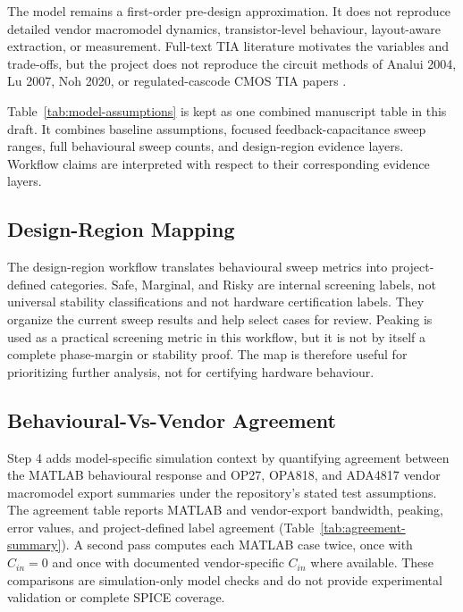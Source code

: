 The model remains a first-order pre-design approximation. It does not reproduce detailed vendor macromodel dynamics, transistor-level behaviour, layout-aware extraction, or measurement. Full-text TIA literature motivates the variables and trade-offs, but the project does not reproduce the circuit methods of Analui 2004, Lu 2007, Noh 2020, or regulated-cascode CMOS TIA papers \citep{ANALUI_2004_BW_ENHANCEMENT,LU_2007_BROADBAND_TIA,NOH_2020_CF_TIA_DC_LOOP,PARK_YOO_2004_RGC_TIA}.

Table~\ref{tab:model-assumptions} is kept as one combined manuscript table in this draft. It combines baseline assumptions, focused feedback-capacitance sweep ranges, full behavioural sweep counts, and design-region evidence layers. Workflow claims are interpreted with respect to their corresponding evidence layers.

\subsection{Design-Region Mapping}

The design-region workflow translates behavioural sweep metrics into project-defined categories. Safe, Marginal, and Risky are internal screening labels, not universal stability classifications and not hardware certification labels. They organize the current sweep results and help select cases for review. Peaking is used as a practical screening metric in this workflow, but it is not by itself a complete phase-margin or stability proof. The map is therefore useful for prioritizing further analysis, not for certifying hardware behaviour.

\subsection{Behavioural-Vs-Vendor Agreement}

Step 4 adds model-specific simulation context by quantifying agreement between the MATLAB behavioural response and OP27, OPA818, and ADA4817 vendor macromodel export summaries under the repository's stated test assumptions. The agreement table reports MATLAB and vendor-export bandwidth, peaking, error values, and project-defined label agreement (Table~\ref{tab:agreement-summary}). A second pass computes each MATLAB case twice, once with $C_{in}=0$ and once with documented vendor-specific $C_{in}$ where available. These comparisons are simulation-only model checks and do not provide experimental validation or complete SPICE coverage.

